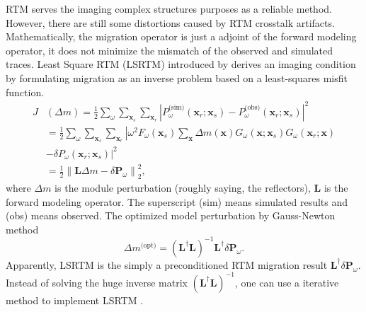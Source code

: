 \documentclass[11pt]{article}
\newcommand{\bx}{\boldsymbol{x}}
\newcommand{\bL}{\boldsymbol{L}}
\newcommand{\bP}{\boldsymbol{P}}
\theoremstyle{plain}
\theoremstyle{definition}
\theoremstyle{remark}
\numberwithin{equation}{section}
\begin{document}
RTM serves the imaging complex structures purposes as a reliable method. However, there are still some distortions caused by RTM crosstalk
artifacts. Mathematically, the migration operator is just a adjoint of the forward modeling operator, it does not minimize the mismatch of the observed and simulated traces. Least Square RTM (LSRTM) introduced by \cite{NemWuAO1999} derives an imaging condition by formulating migration as an inverse problem based on a least-squares misfit function.
  \begin{equation}
  \begin{aligned}
  J&(\Delta m) = \frac{1}{2} \sum\limits_{\omega} \sum\limits_{\bx_s} \sum\limits_{\bx_r} \left| P_{\omega}^{\text{(sim)}}(\bx_r; \bx_s) - P_{\omega}^{\text{(obs)}}(\bx_r; \bx_s) \right|^2 \\
  &= \frac{1}{2} \sum\limits_{\omega} \sum\limits_{\bx_s} \sum\limits_{\bx_r} \left| \omega^2 F_{\omega}(\bx_s) \sum\limits_{\bx}\Delta m(\bx)G_{\omega}(\bx; \bx_s)G_{\omega}(\bx_r; \bx) \right.\\&\left.- \delta P_{\omega}(\bx_r; \bx_s) \right|^2\\
  &= \frac{1}{2} \left\| \bL\Delta m - \delta\bP_{\omega}\right\|_2^2,
  \end{aligned}
  \end{equation}
  where $\Delta m$ is the module perturbation (roughly saying, the reflectors), $\bL$ is the forward modeling operator. The superscript (sim) means simulated results and (obs) means
  observed. The optimized model perturbation by Gauss-Newton method
    \begin{equation}
    \Delta m^{\text{(opt)}} = \left( \bL^{\dag}\bL \right)^{-1} \bL^{\dag} \delta\bP_{\omega}.
    \end{equation}
    Apparently, LSRTM is the simply a preconditioned RTM migration result $\bL^{\dag}\delta \bP_{\omega}$. 
    Instead of solving the huge inverse matrix $(\bL^{\dag}\bL)^{-1}$, one can use a iterative method to implement LSRTM \cite{DonCaiAO2012}.
\end{document}
